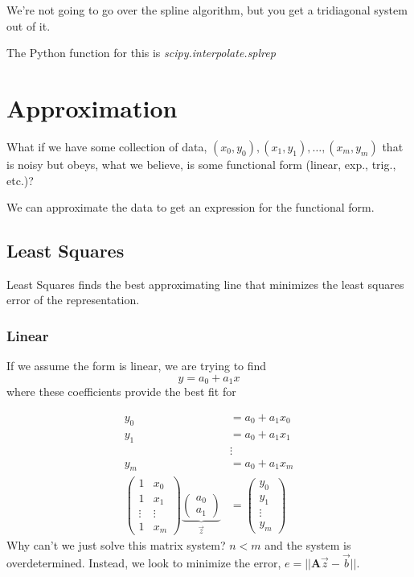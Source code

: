 \documentclass[12pt]{article}
\newcommand{\ve}[1]{\ensuremath{\mathbf{#1}}}
\begin{document}
We're not going to go over the spline algorithm, but you get a tridiagonal system out of it.

The Python function for this is \textit{scipy.interpolate.splrep}


\section{Approximation}

What if we have some collection of data, $(x_0, y_0), (x_1, y_1),\dots, (x_m, y_m)$ that is noisy but obeys, what we believe, is some functional form (linear, exp., trig., etc.)?

We can approximate the data to get an expression for the functional form.

\subsection{Least Squares}
Least Squares finds the best approximating line that minimizes the least squares error of the representation. 

\subsubsection{Linear}
If we assume the form is linear, we are trying to find
\[y = a_0 + a_1 x\]
where these coefficients provide the best fit for
 
\begin{align}
y_0 &= a_0 + a_1 x_0 \\
y_1 &= a_0 + a_1 x_1 \\
& \vdots \\
y_m &= a_0 + a_1 x_m \\
%
\begin{pmatrix}
1 & x_0 \\ 1 & x_1 \\ \vdots & \vdots \\ 1 & x_m
\end{pmatrix}
\underbrace{\begin{pmatrix}
a_0 \\ a_1
\end{pmatrix}}_{\vec{z}} &=
\begin{pmatrix}
y_0 \\ y_1 \\ \vdots \\ y_m
\end{pmatrix}
\end{align}
%
Why can't we just solve this matrix system? $n < m$ and the system is overdetermined. Instead, we look to minimize the error, $e = ||\ve{A}\vec{z} - \vec{b}||$.
\end{document}
